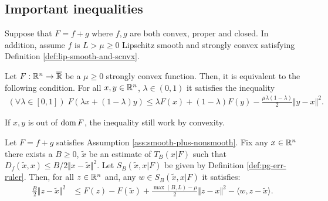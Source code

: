 \documentclass[12pt]{article}
\begin{document}
    \subsection{Important inequalities}
        \begin{assumption}\label{ass:smooth-plus-nonsmooth}
            Suppose that $F = f + g$ where $f, g$ are both convex, proper and closed. 
            In addition, assume $f$ is $L > \mu \ge 0$ Lipschitz smooth and strongly convex satisfying Definition \ref{def:lip-smooth-and-scnvx}. 
        \end{assumption}
        \begin{theorem}\label{thm:jesen}
            Let $F: \mathbb R^n \rightarrow \overline {\mathbb R}$ be a $\mu \ge 0$ strongly convex function. 
            Then, it is equivalent to the following condition. 
            For all $x, y \in \mathbb R^n$, $\lambda \in (0, 1)$ it satisfies the inequality 
            \begin{align*}
                (\forall \lambda \in [0, 1])\; 
                F(\lambda x + (1 - \lambda)y) \le \lambda F(x) + (1 - \lambda)F(y) -\frac{\mu\lambda(1 - \lambda)}{2} \Vert y - x\Vert^2. 
            \end{align*}
        \end{theorem}
        \begin{remark}
            If $x, y$ is out of $\operatorname{dom} F$, the inequality still work by convexity. 
        \end{remark}
        \begin{lemma}\label{lemma:inex-pg-ineq-proto}
            Let $F = f + g$ satisfies Assumption \ref{ass:smooth-plus-nonsmooth}. 
            Fix any $x \in \mathbb R^n$ there exists a $B \ge 0$,  $\tilde x$ be an estimate of $T_B(x | F)$ such that $D_f(\tilde x, x) \le B/2\Vert x - \tilde x\Vert^2$. 
            Let $S_B(\tilde x, x | F)$ be given by Definition \ref{def:pg-err-ruler}. 
            Then, for all $z \in \mathbb R^n$ and, any $w \in S_B(\tilde x, x | F)$ it satisfies: 
            \begin{align*}
                \frac{B}{2}\Vert z - \tilde x\Vert^2 &\le 
                F(z) - F(\tilde x) + \frac{\max(B, L) - \mu}{2}\Vert z - x\Vert^2 - \langle w, z - \tilde x \rangle. 
            \end{align*}
        \end{lemma}
\end{document}
